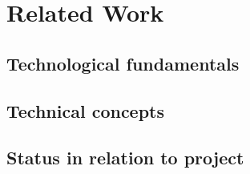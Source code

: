 \chapter{Related Work}
\label{ch:Related-Work}

\section{Technological fundamentals}
\label{sec:Technological-Fundamentatls}

\section{Technical concepts}
\label{sec:Technical-Concepts}

\section{Status in relation to project}
\label{sec:Status-Relation-Project}
